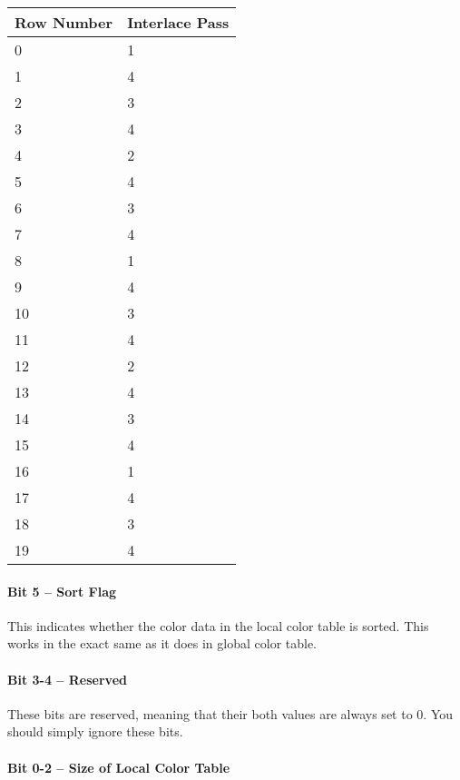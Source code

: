 

\begin{table}
  \centering
  \begin{tabular}{ll}
    \toprule
    Row Number & Interlace Pass \\
    \midrule
    0 & 1 \\
    1 & 4 \\
    2 & 3 \\
    3 & 4 \\
    4 & 2 \\
    5 & 4 \\
    6 & 3 \\
    7 & 4 \\
    8 & 1 \\
    9 & 4 \\
    10 & 3 \\
    11 & 4 \\
    12 & 2 \\
    13 & 4 \\
    14 & 3 \\
    15 & 4 \\
    16 & 1 \\
    17 & 4 \\
    18 & 3 \\
    19 & 4 \\
    \bottomrule
  \end{tabular}
  \caption{}
  \label{tab:gif-interlacing}
\end{table}

\paragraph{Bit 5 -- Sort Flag}

This indicates whether the color data in the local color table is
sorted. This works in the exact same as it does in global color
table.

\paragraph{Bit 3-4 -- Reserved}

These bits are reserved, meaning that their both values are always set
to $0$. You should simply ignore these bits.

\paragraph{Bit 0-2 -- Size of Local Color Table}

